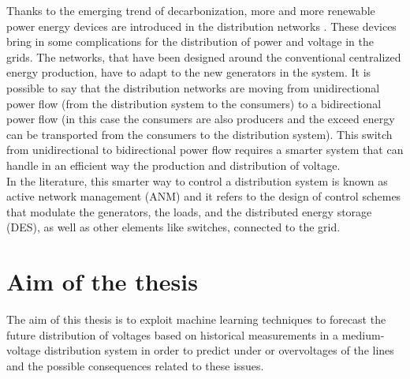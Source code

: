 Thanks to the emerging trend of decarbonization, more and more renewable power energy devices are introduced in the distribution networks \cite{owidenergy}. These devices bring in some complications for the distribution of power and voltage in the grids. The networks, that have been designed around the conventional centralized energy production, have to adapt to the new generators in the system. It is possible to say that the distribution networks are moving from unidirectional power flow (from the distribution system to the consumers) to a bidirectional power flow (in this case the consumers are also producers and the exceed energy can be transported from the consumers to the distribution system). This switch from unidirectional to bidirectional power flow requires a smarter system that can handle in an efficient way the production and distribution of voltage.\\

In the literature, this smarter way to control a distribution system is known as active network management (\gls{ANM}) and it refers to the design of control schemes that modulate the generators, the loads, and the distributed energy storage (\gls{DES}), as well as other elements like switches, connected to the grid. \\


\section{Aim of the thesis}
\label{sec:aimthesis}
The aim of this thesis is to exploit machine learning techniques to forecast the future distribution of voltages based on historical measurements in a medium-voltage distribution system in order to predict under or overvoltages of the lines and the possible consequences related to these issues. 



